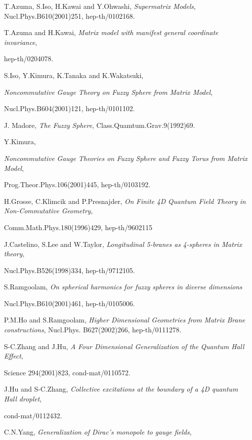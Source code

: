\documentclass[a4paper,11pt]{article}
\begin{document}
\begin{thebibliography}{99}
T.Azuma, S.Iso, H.Kawai and Y.Ohwashi, 
{\it Supermatrix Models}, 
Nucl.Phys.B610(2001)251, 
hep-th/0102168. 

T.Azuma and H.Kawai, 
{\it Matrix model with manifest general coordinate invariance}, 

hep-th/0204078. 

S.Iso, Y.Kimura, K.Tanaka and K.Wakatsuki,  

{\it Noncommutative Gauge Theory on Fuzzy Sphere from Matrix Model}, 

Nucl.Phys.B604(2001)121, hep-th/0101102. 

J. Madore, 
{\it The Fuzzy Sphere}, 
Class.Quamtum.Grav.9(1992)69.


Y.Kimura, 

{\it Noncommutative Gauge Theories on Fuzzy Sphere and Fuzzy Torus 
from Matrix Model}, 

Prog.Theor.Phys.106(2001)445, hep-th/0103192.   




H.Grosse, C.Klimcik and P.Presnajder, 
{\it On Finite 4D Quantum Field Theory in Non-Commutative Geometry}, 

Comm.Math.Phys.180(1996)429, 
hep-th/9602115

J.Castelino, S.Lee and W.Taylor, 
{\it Longitudinal 5-branes as 4-spheres in Matrix theory}, 

Nucl.Phys.B526(1998)334, 
hep-th/9712105.  

S.Ramgoolam, 
{\it On spherical harmonics for fuzzy spheres in diverse dimensions}

Nucl.Phys.B610(2001)461, hep-th/0105006. 

P.M.Ho and S.Ramgoolam, 
{\it Higher Dimensional Geometries from Matrix Brane constructions}, 
Nucl.Phys. B627(2002)266, 
hep-th/0111278. 

S-C.Zhang and J.Hu, 
{\it A Four Dimensional Generalization of the Quantum Hall Effect}, 

Science 294(2001)823, 
cond-mat/0110572.  

J.Hu and S-C.Zhang, 
{\it Collective excitations at the boundary of a 4D quantum Hall droplet}, 

cond-mat/0112432.  

C.N.Yang, 
{\it Generalization of Dirac's monopole to \coordHE{} 
gauge fields}, 


\end{thebibliography}
\end{document}
